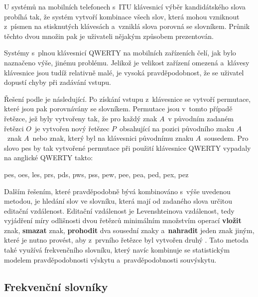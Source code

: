 \documentclass[a4paper,11pt,openany]{book} %
\newcommand\exmp{\textsf}
\begin{document}
U systémů na mobilních telefonech s~ITU klávesnicí výběr kandidátského slova probíhá tak, že systém vytvoří kombinace všech slov, která mohou vzniknout z~písmen na stisknutých klávesách a~vzniklá slova porovná se slovníkem. Průnik těchto dvou množin pak je uživateli nějakým způsobem prezentován. 

Systémy s~plnou klávesnicí QWERTY na mobilních zařízeních čelí, jak bylo naznačeno výše, jinému problému. Jelikož je velikost zařízení omezená a~klávesy klávesnice jsou tudíž relativně malé, je vysoká pravděpodobnost, že se uživatel dopustí chyby při zadávání vstupu. \parencite{kocienda2012method} %

Řešení podle \parencite{kocienda2012method} je následující. Po získání vstupu z~klávesnice se vytvoří permutace, které jsou pak porovnávány se slovníkem. Permutace jsou v~tomto případě řetězce, jež byly vytvořeny tak, že pro každý znak $A$~v původním zadaném řetězci $O$~je vytvořen nový řetězec $P$~obsahující na pozici původního znaku $A$~znak $A$~nebo znak, který byl na klávesnici původnímu znaku $A$~sousedem. Pro slovo \exmp{pes} by tak vytvořené permutace při použití klávesnice QWERTY vypadaly na anglické QWERTY takto: %

\begin{center} 
	\exmp{pes, oes, les, prs, pds, pws, pss, pew, pee, pea, ped, pex, pez}
\end{center}

Dalším řešením, které pravděpodobně bývá kombinováno s~výše uvedenou metodou, je hledání slov ve slovníku, která mají od zadaného slova určitou editační vzdálenost. Editační vzdálenost je Levenshteinova vzdálenost, tedy vyjádření míry odlišnosti dvou řetězců minimálním množstvím operací {\bf vložit} znak, {\bf smazat} znak, {\bf prohodit} dva sousední znaky a~{\bf nahradit} jeden znak jiným, které je nutno provést, aby z~prvního řetězce byl vytvořen druhý \parencite{levenshtein-en1966}. \nocite{levenshtein1965}  %
Tato metoda také využívá frekvenčního slovníku, který navíc kombinuje se statistickým modelem pravděpodobnosti výskytu a~pravděpodobnosti souvýskytu. \parencite{peternorvig} %

\subsection{Frekvenční slovníky}\label{frecdic}
\end{document}

